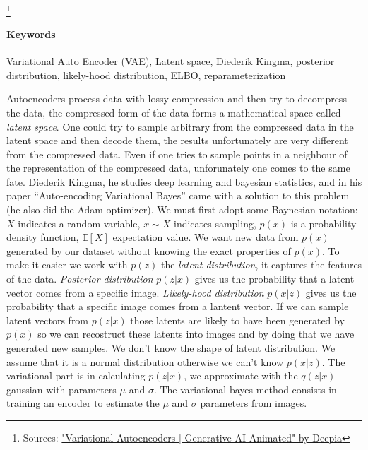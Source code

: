 



\footnote{Sources: \href{https://youtu.be/qJeaCHQ1k2w?si=3jG7sa0t9ay1N441}{"Variational Autoencoders | Generative AI Animated" by Deepia}}

\paragraph{\textbf{Keywords}}
Variational Auto Encoder (VAE), Latent space, Diederik Kingma, posterior distribution, likely-hood distribution, ELBO, reparameterization

\begin{multicols}{3}
  Autoencoders process data with lossy compression and then try to decompress the data, the compressed form of the data forms a mathematical space called \textit{latent space}.
  One could try to sample arbitrary from the compressed data in the latent space and then decode them, the results unfortunately are very different from the compressed data.
  Even if one tries to sample points in a neighbour of the representation of the compressed data, unforunately one comes to the same fate.
  Diederik Kingma, he studies deep learning and bayesian statistics, and in his paper ``Auto-encoding Variational Bayes'' came with a solution to this problem (he also did the
  Adam optimizer).
  We must first adopt some Baynesian notation: $X$ indicates a random variable, $x \sim X$ indicates sampling,  $p(x)$ is a probability density function,
  $\mathbb{E}[X]$ expectation value.
  We want new data from $p(x)$ generated by our dataset without knowing the exact properties of $p(x)$.
  To make it easier we work with $p(z)$ the \textit{latent distribution}, it captures the features of the data.
  \textit{Posterior distribution} $p(z|x)$ gives us the probability that a latent vector comes from a specific image.
  \textit{Likely-hood distribution} $p(x|z)$ gives us the probability that a specific image comes from a lantent vector.
  If we can sample latent vectors from $p(z|x)$ those latents are likely to have been generated by $p(x)$
  so we can recostruct these latents into images and by doing that we have generated new samples.
  We don't know the shape of latent distribution. We assume that it is a normal distribution otherwise we can't know $p(x|z)$.
  The variational part is in calculating $p(z|x)$, we approximate with the $q(z|x)$ gaussian with parameters $\mu$ and $\sigma$.
  The variational bayes method consists in training an encoder to estimate the $\mu$ and $\sigma$ parameters from images.

\end{multicols}
